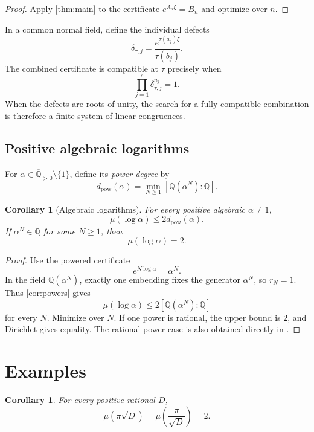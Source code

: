 \documentclass[11pt]{article}
\newcommand{\QQ}{\mathbb Q}
\newcommand{\Qbar}{\overline{\mathbb Q}}
\newtheorem{corollary}[theorem]{Corollary}
\theoremstyle{definition}
\theoremstyle{remark}
\numberwithin{equation}{section}
\begin{document}
\begin{proof}
Apply \cref{thm:main} to the certificate
$e^{A_n\xi}=B_n$ and optimize over $n$.
\end{proof}

In a common normal field, define the individual defects
\[
 \delta_{\tau,j}=\frac{e^{\tau(a_j)\xi}}{\tau(b_j)}.
\]
The combined certificate is compatible at $\tau$ precisely when
\[
 \prod_{j=1}^s\delta_{\tau,j}^{n_j}=1.
\]
When the defects are roots of unity, the search for a fully compatible
combination is therefore a finite system of linear congruences.

\subsection{Positive algebraic logarithms}

For $\alpha\in\Qbar_{>0}\setminus\{1\}$, define its \emph{power degree}
by
\begin{equation}\label{eq:power-degree}
 d_{\mathrm{pow}}(\alpha)=
 \min_{N\ge1}[\QQ(\alpha^N):\QQ].
\end{equation}

\begin{corollary}[Algebraic logarithms]\label{cor:alglog}
For every positive algebraic $\alpha\ne1$,
\[
 \boxed{\mu(\log\alpha)\le2d_{\mathrm{pow}}(\alpha).}
\]
If $\alpha^N\in\QQ$ for some $N\ge1$, then
\[
 \boxed{\mu(\log\alpha)=2}.
\]
\end{corollary}

\begin{proof}
Use the powered certificate
\[
 e^{N\log\alpha}=\alpha^N.
\]
In the field $\QQ(\alpha^N)$, exactly one embedding fixes the generator
$\alpha^N$, so $r_N=1$.  Thus \cref{cor:powers} gives
\[
 \mu(\log\alpha)
 \le2[\QQ(\alpha^N):\QQ]
\]
for every $N$.  Minimize over $N$.  If one power is rational, the upper
bound is $2$, and Dirichlet gives equality.  The rational-power case is
also obtained directly in \cite[Corollary~7]{LiuJiangZhang2026}.
\end{proof}

\section{Examples}\label{sec:examples}

\begin{corollary}\label{cor:pi-examples}
For every positive rational $D$,
\[
 \mu(\pi\sqrt D)=\mu\left(\frac\pi{\sqrt D}\right)=2.
\]
\end{corollary}
\end{document}

